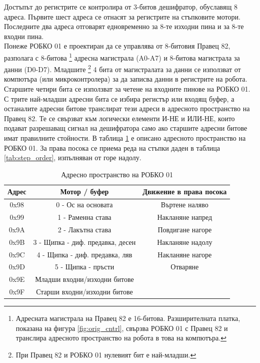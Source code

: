 Достъпът до регистрите се контролира от 3-битов дешифратор, обуславящ 8 адреса. Първите шест адреса се отнасят за регистрите на стъпковите мотори. Последните два адреса отговарят едновременно за 8-те изходни пина и за 8-те входни пина.\\
\indent{}
Понеже РОБКО 01 е проектиран да се управлява от 8-битовия Правец 82, разполага с 8-битова
\footnote{Адресната магистрала на Правец 82 е 16-битова.
\cite{pravets82}
Разширителната платка, показана на фигура \ref{fig:orig_cntrl}, свързва РОБКО 01 с Правец 82 и транслира адресното пространство на робота в това на компютъра.}
адресна магистрала (A0-A7) и 8-битова магистрала за данни (D0-D7). Младшите
\footnote{При Правец 82 и РОБКО 01 нулевият бит е най-младши.}
4 бита от магистралата за данни се използват от компютъра (или микроконтролера) за да записва данни в регистрите на робота. Старшите четири бита се използват за четене на входните пинове на РОБКО 01.\\
\indent{}
С трите най-младши адресни бита се избира регистър или входящ буфер, а останалите адресни битове транслират тези адреси в адресното пространство на Правец 82. Те се свързват към логически елементи И-НЕ и ИЛИ-НЕ, които подават разрешаващ сигнал на дешифратора само ако старшите адресни битове имат правилните стойности. В таблица \ref{tab:addr_space} е описано адресното пространство на РОБКО 01. За права посока се приема реда на стъпки даден в таблица \ref{tab:step_order}, изпълняван от горе надолу.\\
\begin{table}[!htb]
    \centering
    \begin{tabular}{|c|c|c|}
        \hline
        Адрес & Мотор / буфер & Движение в права посока\\
        \hline
        0x98 & 0 - Ос на основата & Въртене наляво\\
        0x99 & 1 - Раменна става & Накланяне напред\\
        0x9A & 2 - Лакътна става & Повдигане нагоре\\
        0x9B & 3 - Щипка - диф. предавка, десен & Накланяне надолу\\
        0x9C & 4 - Щипка - диф. предавка, ляв & Накланяне нагоре\\
        0x9D & 5 - Щипка - пръсти & Отваряне\\
        \cline{3-3}
        0x9E & Младши входни/изходни битове & \multicolumn{1}{c}{}\\
        0x9F & Старши входни/изходни битове & \multicolumn{1}{c}{}\\
        \cline{1-2}
    \end{tabular}
    \caption{Адресно пространство на РОБКО 01}
    \label{tab:addr_space}
\end{table}
